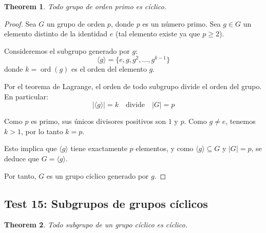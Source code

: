 \documentclass[11pt,a4paper]{article}
\theoremstyle{plain}
\newtheorem{theorem}{Theorem}[section]
\theoremstyle{definition}
\begin{document}
\begin{theorem}
Todo grupo de orden primo es cíclico.
\end{theorem}

\begin{proof}
Sea $G$ un grupo de orden $p$, donde $p$ es un número primo. Sea $g \in G$ un elemento distinto de la identidad $e$ (tal elemento existe ya que $p \geq 2$).

Consideremos el subgrupo generado por $g$:
\[
\langle g \rangle = \{e, g, g^2, \ldots, g^{k-1}\}
\]
donde $k = \operatorname{ord}(g)$ es el orden del elemento $g$.

Por el teorema de Lagrange, el orden de todo subgrupo divide el orden del grupo. En particular:
\[
|\langle g \rangle| = k \quad \text{divide} \quad |G| = p
\]

Como $p$ es primo, sus únicos divisores positivos son $1$ y $p$. Como $g \neq e$, tenemos $k > 1$, por lo tanto $k = p$.

Esto implica que $\langle g \rangle$ tiene exactamente $p$ elementos, y como $\langle g \rangle \subseteq G$ y $|G| = p$, se deduce que $G = \langle g \rangle$.

Por tanto, $G$ es un grupo cíclico generado por $g$.
\end{proof}

\subsection{Test 15: Subgrupos de grupos cíclicos}

\begin{theorem}
Todo subgrupo de un grupo cíclico es cíclico.
\end{theorem}
\end{document}
